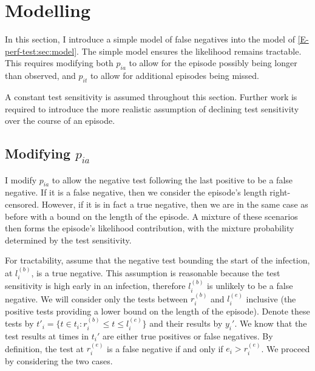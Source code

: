 \documentclass[thesis.tex]{subfiles}
\begin{document}

\section{Modelling} \label{imperf-test:sec:modelling}

In this section, I introduce a simple model of false negatives into the model of \cref{E-perf-test:sec:model}.
The simple model ensures the likelihood remains tractable.
This requires modifying both $p_{ia}$ to allow for the episode possibly being longer than observed, and $p_{it}$ to allow for additional episodes being missed.

A constant test sensitivity is assumed throughout this section.
Further work is required to introduce the more realistic assumption of declining test sensitivity over the course of an episode.

\subsection{Modifying \texorpdfstring{$p_{ia}$}{pia}} \label{modifying-p_ia}

I modify $p_{ia}$ to allow the negative test following the last positive to be a false negative.
If it is a false negative, then we consider the episode's length right-censored.
However, if it is in fact a true negative, then we are in the same case as before with a bound on the length of the episode.
A mixture of these scenarios then forms the episode's likelihood contribution, with the mixture probability determined by the test sensitivity.

For tractability, assume that the negative test bounding the start of the infection, at $l_i^{(b)}$, is a true negative.
This assumption is reasonable because the test sensitivity is high early in an infection, therefore $l_i^{(b)}$ is unlikely to be a false negative.
We will consider only the tests between $r_i^{(b)}$ and $l_i^{(e)}$ inclusive (the positive tests providing a lower bound on the length of the episode).
Denote these tests by $t'_i = \{ t \in t_i : r_i^{(b)} \leq t \leq l_i^{(e)} \}$ and their results by $y_i'$.
We know that the test results at times in $t_i'$ are either true positives or false negatives. 
By definition, the test at $r_i^{(e)}$ is a false negative if and only if $e_i > r_i^{(e)}$.
We proceed by considering the two cases.
\end{document}
